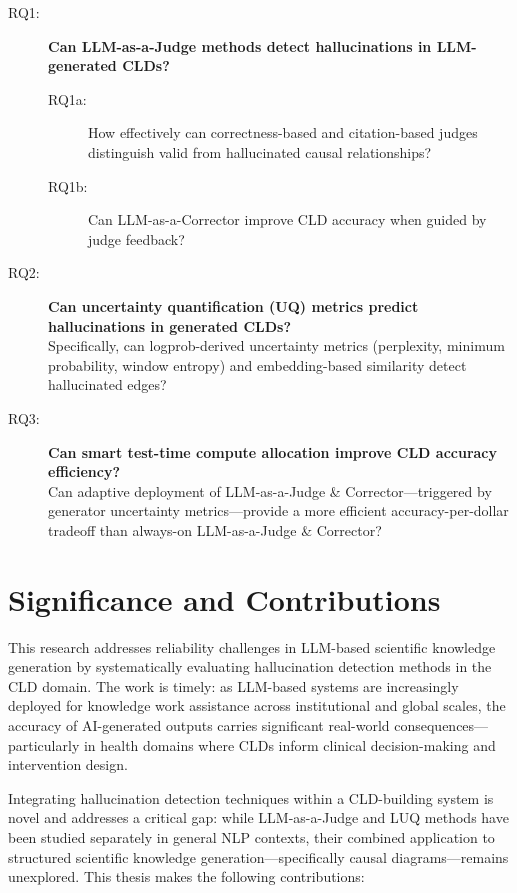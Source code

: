\begin{description}
    \item[RQ1:] \textbf{Can LLM-as-a-Judge methods detect hallucinations in LLM-generated CLDs?}
    \begin{description}
        \item[RQ1a:] How effectively can correctness-based and citation-based judges distinguish valid from hallucinated causal relationships?
        \item[RQ1b:] Can LLM-as-a-Corrector improve CLD accuracy when guided by judge feedback?
    \end{description}
    
    \item[RQ2:] \textbf{Can uncertainty quantification (UQ) metrics predict hallucinations in generated CLDs?}\\
    Specifically, can logprob-derived uncertainty metrics (perplexity, minimum probability, window entropy) and embedding-based similarity detect hallucinated edges?
    
    \item[RQ3:] \textbf{Can smart test-time compute allocation improve CLD accuracy efficiency?}\\
    Can adaptive deployment of LLM-as-a-Judge \& Corrector---triggered by generator uncertainty metrics---provide a more efficient accuracy-per-dollar tradeoff than always-on LLM-as-a-Judge \& Corrector?
\end{description}

\section*{Significance and Contributions}

This research addresses reliability challenges in LLM-based scientific knowledge generation by systematically evaluating hallucination detection methods in the CLD domain. The work is timely: as LLM-based systems are increasingly deployed for knowledge work assistance across institutional and global scales, the accuracy of AI-generated outputs carries significant real-world consequences---particularly in health domains where CLDs inform clinical decision-making and intervention design.

Integrating hallucination detection techniques within a CLD-building system is novel and addresses a critical gap: while LLM-as-a-Judge and LUQ methods have been studied separately in general NLP contexts, their combined application to structured scientific knowledge generation---specifically causal diagrams---remains unexplored. This thesis makes the following contributions:

